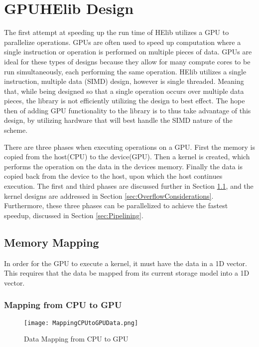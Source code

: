\chapter{GPUHElib Design} \label{chap:GPUHElibDesign}
The first attempt at speeding up the run time of HElib utilizes a GPU to parallelize operations. GPUs are often used to speed up computation where a single instruction or operation is performed on multiple pieces of data. GPUs are ideal for these types of designs because they allow for many compute cores to be run simultaneously, each performing the same operation. HElib utilizes a single instruction, multiple data (SIMD) design, however is single threaded. Meaning that, while being designed so that a single operation occurs over multiple data pieces, the library is not efficiently utilizing the design to best effect. The hope then of adding GPU functionality to the library is to thus take advantage of this design, by utilizing hardware that will best handle the SIMD nature of the scheme. 

There are three phases when executing operations on a GPU. First the memory is copied from the host(CPU) to the device(GPU). Then a kernel is created, which performs the operation on the data in the devices memory. Finally the data is copied back from the device to the host, upon which the host continues execution. The first and third phases are discussed further in Section \ref{sec:MemoryMapping}, and the kernel designs are addressed in Section \ref{sec:OverflowConsiderations}. Furthermore, these three phases can be parallelized to achieve the fastest speedup, discussed in Section \ref{sec:Pipelining}.

\section{Memory Mapping} \label{sec:MemoryMapping}
In order for the GPU to execute a kernel, it must have the data in a 1D vector. This requires that the data be mapped from its current storage model into a 1D vector.

\subsection{Mapping from CPU to GPU}

\begin{figure}[htp]
\centering
\texttt{[image: MappingCPUtoGPUData.png]}
\caption{Data Mapping from CPU to GPU}
\label{fig:MappingCPUtoGPUData}
\end{figure}

